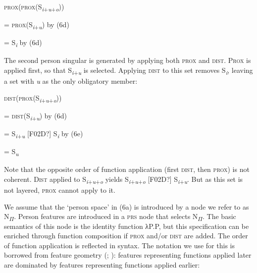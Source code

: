 \documentclass[output=paper]{langsci/langscibook}
\begin{document}
\ea 
    \textsc{prox}(\textsc{prox}(S\textit{\textsubscript{i}}\textsubscript{+}\textit{\textsubscript{u}}\textsubscript{+}\textit{\textsubscript{o}}))    

    = \textsc{prox}(S\textit{\textsubscript{i}}\textsubscript{+}\textit{\textsubscript{u}})        by (6d)

    = S\textit{\textsubscript{i}}          by (6d)
\z

The second person singular is generated by applying both \textsc{prox} and \textsc{dist}. \textsc{Prox} is applied first, so that S\textit{\textsubscript{i}}\textsubscript{+}\textit{\textsubscript{u}} is selected. Applying \textsc{dist} to this set removes S\textit{\textsubscript{i}}, leaving a set with \textit{u} as the only obligatory member:

\ea 
     \textsc{dist}(\textsc{prox}(S\textit{\textsubscript{i}}\textsubscript{+}\textit{\textsubscript{u}}\textsubscript{+}\textit{\textsubscript{o}}))    

    = \textsc{dist}(S\textit{\textsubscript{i}}\textsubscript{+}\textit{\textsubscript{u}})        by (6d)

    = S\textit{\textsubscript{i}}\textsubscript{+}\textit{\textsubscript{u}} [F02D?] S\textit{\textsubscript{i}}        by (6e)

    = S\textit{\textsubscript{u}}
\z



Note that the opposite order of function application (first \textsc{dist}, then \textsc{prox}) is not coherent. \textsc{Dist} applied to S\textit{\textsubscript{i}}\textsubscript{+}\textit{\textsubscript{u}}\textsubscript{+}\textit{\textsubscript{o}} yields S\textit{\textsubscript{i}}\textsubscript{+}\textit{\textsubscript{u}}\textsubscript{+}\textit{\textsubscript{o}} [F02D?] S\textit{\textsubscript{i}}\textsubscript{+}\textit{\textsubscript{u}}. But as this set is not layered, \textsc{prox} cannot apply to it.

We assume that the ‘person space’ in (6a) is introduced by a node we refer to as N\textsubscript{$\Pi $}. Person features are introduced in a \textsc{prs} node that selects N\textsubscript{$\Pi $}. The basic semantics of this node is the identity function λP.P, but this specification can be enriched through function composition if \textsc{prox} and/or \textsc{dist} are added. The order of function application is reflected in syntax. The notation we use for this is borrowed from feature geometry (\citealt{Gazdar1982}; \citealt{Harley2002Person}): features representing functions applied later are dominated by features representing functions applied earlier:
\end{document}
